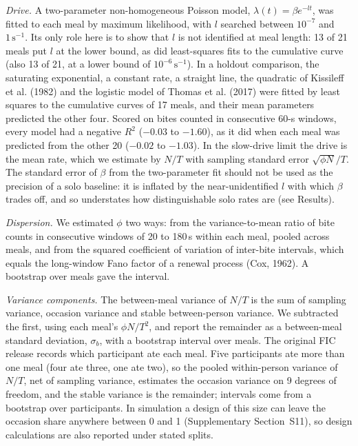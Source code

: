 \documentclass[12pt]{article}
\begin{document}
\emph{Drive.} A two-parameter non-homogeneous Poisson model,
$\lambda(t)=\beta e^{-lt}$, was fitted to each meal by maximum likelihood, with $l$
searched between $10^{-7}$ and $1\,\mathrm{s}^{-1}$. Its
only role here is to show that $l$ is not identified at meal length: 13 of 21
meals put $l$ at the lower bound, as did least-squares fits to the cumulative
curve (also 13 of 21, at a lower bound of $10^{-6}\,\mathrm{s}^{-1}$). In a holdout
comparison, the saturating exponential, a constant rate, a straight line, the
quadratic of Kissileff et al. (1982) and the logistic model of Thomas et al. (2017)
were fitted by least squares to the cumulative curves of 17 meals, and their mean
parameters predicted the other four. Scored on bites counted in consecutive 60-s
windows, every model had a negative $R^2$ ($-0.03$ to $-1.60$), as it did when each
meal was predicted from the other 20 ($-0.02$ to $-1.03$).
 In the slow-drive limit the drive is the mean rate, which we estimate by
$N/T$ with sampling standard error $\sqrt{\phi N}/T$. The standard error of
$\beta$ from the two-parameter fit should not be used as the precision of a solo
baseline: it is inflated by the near-unidentified $l$ with which $\beta$ trades
off, and so understates how distinguishable solo rates are (see Results).

\emph{Dispersion.} We estimated $\phi$ two ways: from the variance-to-mean ratio
of bite counts in consecutive windows of 20 to 180\,s within each meal, pooled
across meals, and from the squared coefficient of variation of inter-bite
intervals, which equals the long-window Fano factor of a renewal process (Cox,
1962). A bootstrap over meals gave the interval.

\emph{Variance components.} The between-meal variance of $N/T$ is the sum of
sampling variance, occasion variance and stable between-person variance. We
subtracted the first, using each meal's $\phi N/T^2$, and report the remainder as
a between-meal standard deviation, $\sigma_b$, with a bootstrap interval over
meals. The original FIC release records which participant ate each meal. Five
participants ate more than one meal (four ate three, one ate two), so the pooled
within-person variance of $N/T$, net of sampling variance, estimates the occasion
variance on 9 degrees of freedom, and the stable variance is the remainder;
intervals come from a bootstrap over participants. In simulation a design of this
size can leave the occasion share anywhere between 0 and 1 (Supplementary
Section~S11), so design calculations are also reported under stated splits.
\end{document}
